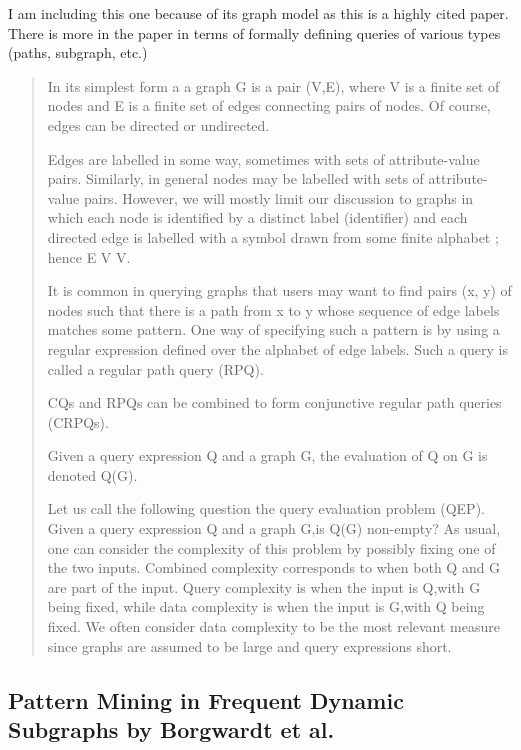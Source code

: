 \documentclass[10pt]{article}
\begin{document}
\begin{itemize}
I am including this one because of its graph model as this is a highly cited paper. There is more in the paper in terms of formally defining queries of various types (paths, subgraph, etc.)

\begin{quote}

In its simplest form a a graph G is a pair (V,E), where V is a finite set of nodes and E is a finite set of edges connecting pairs of nodes. Of course, edges can be directed or undirected. 

Edges are labelled in some way, sometimes with sets of attribute-value pairs. Similarly, in general nodes may be labelled with sets of attribute-value pairs. However, we will mostly limit our discussion to graphs in which each node is identified by a distinct label (identifier) and each directed edge is labelled with a symbol drawn from some finite alphabet \Sigma; hence E \subseteq V \times \Sigma \times V.

It is common in querying graphs that users may want to find pairs (x, y) of nodes such that there is a path from x to y whose sequence of edge labels matches some pattern. One way of specifying such a pattern is by using a regular expression defined over the alphabet of edge labels. Such a query is called a regular path query (RPQ).

CQs and RPQs can be combined to form conjunctive regular path queries (CRPQs).

Given a query expression Q and a graph G, the evaluation of Q on G is denoted Q(G).

Let us call the following question the query evaluation problem (QEP). Given a query expression Q and a graph G,is Q(G) non-empty? As usual, one can consider the complexity of this problem by possibly fixing one of the two inputs. Combined complexity corresponds to when both Q and G are part of the input. Query complexity is when the input is Q,with G being fixed, while data complexity is when the input is G,with Q being fixed. We often consider data complexity to be the most relevant measure since graphs are assumed to be large and query expressions short.

\end{quote}

\subsection{Pattern Mining in Frequent Dynamic Subgraphs by Borgwardt et al.}


\end{itemize}
\end{document}
